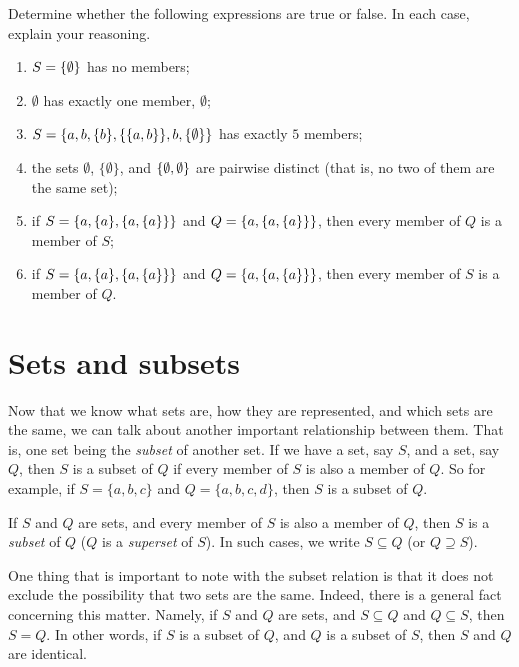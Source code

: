 \begin{exc}
	Determine whether the following expressions are true or false. In each case, explain your reasoning. 
	
	\begin{enumerate}
	\item $S=\{\emptyset\}$ has no members;
	\item $\emptyset$ has exactly one member, $\emptyset$;
	\item $S=\{a, b, \{b\}, \{\{a, b\}\},b, \{\emptyset\}\}$ has exactly $5$ members;
	\item the sets $\emptyset$, $\{\emptyset\}$, and $\{\emptyset, \emptyset\}$ are pairwise distinct (that is, no two of them are the same set);
	\item if $S=\{a, \{a\}, \{a, \{a\}\}\}$ and $Q=\{a, \{a, \{a\}\}\}$, then every member of $Q$ is a member of $S$;
	\item if $S=\{a, \{a\}, \{a, \{a\}\}\}$ and $Q=\{a, \{a, \{a\}\}\}$, then every member of $S$ is a member of $Q$. 
	\end{enumerate}
\end{exc}

\section{Sets and subsets}

Now that we know what sets are, how they are represented, and which sets are the same, we can talk about another important relationship between them. That is, one set being the \textit{subset} of another set. If we have a set, say $S$, and a set, say $Q$, then $S$ is a subset of $Q$ if every member of $S$ is also a member of $Q$. So for example, if $S=\{a, b,c\}$ and $Q=\{a, b, c, d\}$, then $S$ is a subset of $Q$. 

\begin{defn}[Subset]
If $S$ and $Q$ are sets, and every member of $S$ is also a member of $Q$, then $S$ is a \textit{subset} of $Q$ ($Q$ is a \textit{superset} of $S$). In such cases, we write $S \subseteq Q$ (or $Q \supseteq S$). 
\end{defn}

One thing that is important to note with the subset relation is that it does not exclude the possibility that two sets are the same. Indeed, there is a general fact concerning this matter. Namely, if $S$ and $Q$ are sets, and $S \subseteq Q$ and $Q \subseteq S$, then $S=Q$. In other words, if $S$ is a subset of $Q$, and $Q$ is a subset of $S$, then $S$ and $Q$ are identical. 

